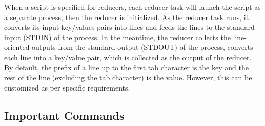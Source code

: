 When a script is specified for reducers, each reducer task will launch the script as a separate process, then the reducer is initialized. As the reducer task runs, it converts its input key/values pairs into lines and feeds the lines to the standard input (STDIN) of the process. In the meantime, the reducer collects the line-oriented outputs from the standard output (STDOUT) of the process, converts each line into a key/value pair, which is collected as the output of the reducer. By default, the prefix of a line up to the first tab character is the key and the rest of the line (excluding the tab character) is the value. However, this can be customized as per specific requirements.

\subsection{Important Commands}
